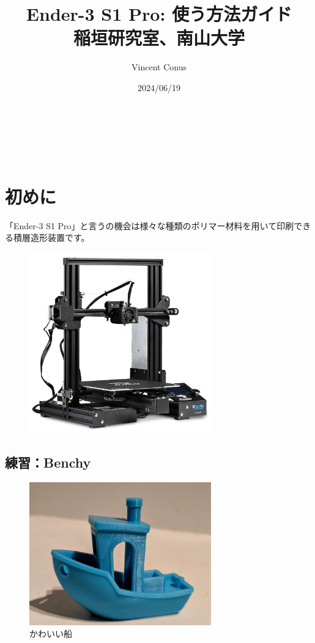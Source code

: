 \documentclass[10pt,a4paper,onecolumn,notitlepage,oneside,dvipdfmx]{article}
\author{Vincent Conus}
\date{2024/06/19}
\title{Ender-3 S1 Pro: 使う方法ガイド\\\medskip
\large 稲垣研究室、南山大学}
\makeatletter
\renewcommand{\maketitle}{%
\begin{center}{\Large \@title}\end{center}%
\begin{flushright}\@author\\ \@date\end{flushright}%
\hrulefill\\}
\makeatother
\begin{document}
\maketitle
\tableofcontents

\section{初めに}
\label{sec:orga813bd2}
「Ender-3 S1 Pro」と言うの機会は様々な種類のポリマー材料を用いて印刷できる積層造形装置です。

\begin{figure}[htbp]
\centering
\includegraphics[width=0.7\textwidth]{img/ender3.png}
\end{figure}

\subsection{練習：Benchy}
\label{sec:orgf429a9d}
\begin{figure}[htbp]
\centering
\includegraphics[width=0.7\textwidth]{img/benchy.jpg}
\caption{かわいい船}
\end{figure}
\end{document}
